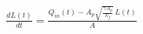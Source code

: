 \documentclass[preview]{standalone}
\begin{document}
\begin{align*}
\frac{dL(t)}{dt} = \frac{Q_{in}(t) - A_p \sqrt{\frac{\gamma A_p}{k_f}}\, L(t)}{A}
\end{align*}
\end{document}
